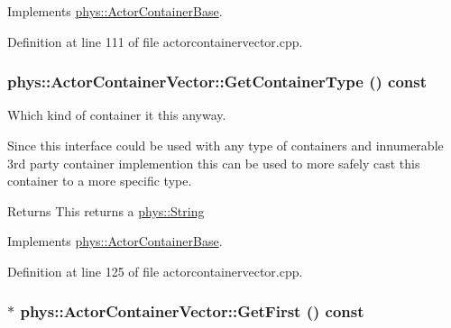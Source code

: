 Implements \hyperlink{classphys_1_1ActorContainerBase_a2c8fb86a9e188aece105b2a753ccc19a}{phys::ActorContainerBase}.



Definition at line 111 of file actorcontainervector.cpp.

\hypertarget{classphys_1_1ActorContainerVector_ae18c29b30d840e0f4fc9b553dd5ca32c}{
\subsubsection[{GetContainerType}]{ phys::ActorContainerVector::GetContainerType () const}}
\label{d3/d64/classphys_1_1ActorContainerVector_ae18c29b30d840e0f4fc9b553dd5ca32c}


Which kind of container it this anyway. 

Since this interface could be used with any type of containers and innumerable 3rd party container implemention this can be used to more safely cast this container to a more specific type. \begin{DoxyReturn}{Returns}
This returns a \hyperlink{namespacephys_aa03900411993de7fbfec4789bc1d392e}{phys::String} 
\end{DoxyReturn}


Implements \hyperlink{classphys_1_1ActorContainerBase_a0ed43bc828aaee8ee33152970c3cc16d}{phys::ActorContainerBase}.



Definition at line 125 of file actorcontainervector.cpp.

\hypertarget{classphys_1_1ActorContainerVector_a55ceecd017455f3185aa62798811e3c6}{
\subsubsection[{GetFirst}]{ $\ast$ phys::ActorContainerVector::GetFirst () const}}
\label{d3/d64/classphys_1_1ActorContainerVector_a55ceecd017455f3185aa62798811e3c6}


